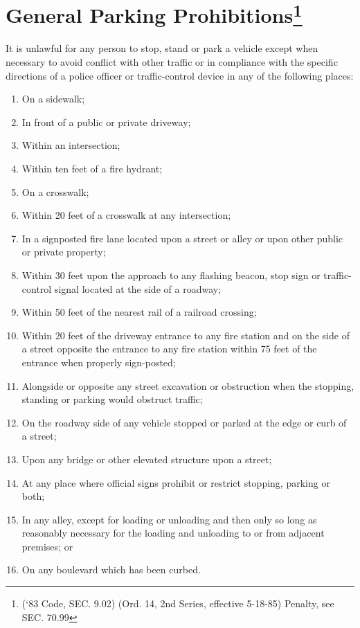 \section{General Parking Prohibitions\footnote{(‘83 Code, SEC. 9.02)  (Ord. 14, 2nd Series, effective 5-18-85)  Penalty, see SEC. 70.99}}
It is unlawful for any person to stop, stand or park a vehicle except when necessary to avoid conflict with other traffic or in compliance with the specific directions of a police officer or traffic-control device in any of the following places:
\begin{enumerate}[{\indent}A)]
\item On a sidewalk;
\item In front of a public or private driveway;
\item Within an intersection;
\item Within ten feet of a fire hydrant;
\item On a crosswalk;
\item Within 20 feet of a crosswalk at any intersection;
\item In a signposted fire lane located upon a street or alley or upon other public or private property;
\item Within 30 feet upon the approach to any flashing beacon, stop sign or traffic-control signal located at the side of a roadway;
\item Within 50 feet of the nearest rail of a railroad crossing;
\item Within 20 feet of the driveway entrance to any fire station and on the side of a street opposite the entrance to any fire station within 75 feet of the entrance when properly sign-posted;
\item Alongside or opposite any street excavation or obstruction when the stopping, standing or parking would obstruct traffic;
\item On the roadway side of any vehicle stopped or parked at the edge or curb of a street;
\item Upon any bridge or other elevated structure upon a street;
\item At any place where official signs prohibit or restrict stopping, parking or both;
\item In any alley, except for loading or unloading and then only so long as reasonably necessary for the loading and unloading to or from adjacent premises; or
\item On any boulevard which has been curbed.
\end{enumerate}

